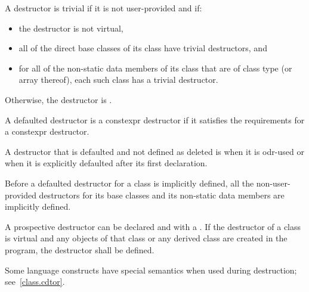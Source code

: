 \pnum
A destructor is trivial if it is not user-provided and if:
\begin{itemize}
\item the destructor is not virtual,

\item all of the direct base classes of its class have trivial destructors, and

\item for all of the non-static data members of its class that are of class
type (or array thereof), each such class has a trivial destructor.
\end{itemize}

Otherwise, the destructor is
.

\pnum
A defaulted destructor is a constexpr destructor
if it satisfies the requirements for a constexpr destructor.

\pnum
A destructor
that is defaulted and not defined as deleted
is
when it is odr-used
or when it is explicitly defaulted after its first declaration.

\pnum
Before a
defaulted destructor for a class is implicitly defined, all the non-user-provided
destructors for its base classes and its non-static data members are
implicitly defined.

\pnum
{}%
%
A prospective destructor can be
declared 
and with a .
If the destructor of a class is virtual and
any objects of that class or any derived class are created in the program,
the destructor shall be defined.

\pnum
\begin{note}
%
Some language constructs have special semantics when used during destruction;
see~\ref{class.cdtor}.
\end{note}

